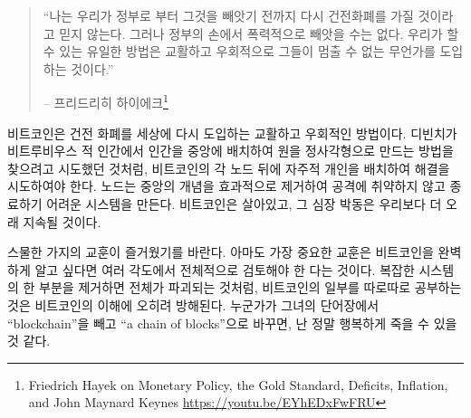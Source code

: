 \begin{quotation}\begin{samepage}
		\enquote{나는 우리가 정부로 부터 그것을 빼앗기 전까지 다시 건전화폐를 가질 것이라고 믿지 않는다. 그러나 정부의 손에서 폭력적으로 빼앗을 수는 없다. 우리가 할 수 있는 유일한 방법은 교활하고 우회적으로 그들이 멈출 수 없는 무언가를 도입하는 것이다.}
		\begin{flushright} -- 프리드리히 하이에크\footnote{Friedrich Hayek on Monetary Policy, the Gold Standard, Deficits, Inflation, and John Maynard Keynes \url{https://youtu.be/EYhEDxFwFRU}}
\end{flushright}\end{samepage}\end{quotation}

\begin{comment}
	Bitcoin is the sly, roundabout way to re-introduce good money to the world. It
	does so by placing a sovereign individual behind each node, just like Da Vinci
	tried to solve the intractable problem of squaring a circle by placing the
	Vitruvian Man in its center. Nodes effectively remove any concept of a center,
	creating a system which is astonishingly antifragile and extremely hard to shut
	down. Bitcoin lives, and its heartbeat will probably outlast all of ours.
\end{comment}
비트코인은 건전 화폐를 세상에 다시 도입하는 교활하고 우회적인 방법이다.
디빈치가 비트루비우스 적 인간에서 인간을 중앙에 배치하여 원을 정사각형으로 만드는 방법을 찾으려고 시도했던 것처럼,
비트코인의 각 노드 뒤에 자주적 개인을 배치하여 해결을 시도하여야 한다.
노드는 중앙의 개념을 효과적으로 제거하여 공격에 취약하지 않고 종료하기 어려운 시스템을 만든다.
비트코인은 살아있고, 그 심장 박동은 우리보다 더 오래 지속될 것이다.

\begin{comment}
	I hope you have enjoyed these twenty-one lessons. Maybe the most important
	lesson is that Bitcoin should be examined holistically, from multiple angles, if
	one would like to have something approximating a complete picture. Just like
	removing one part from a complex system destroys the whole, examining parts of
	Bitcoin in isolation seems to taint the understanding of it. If only one person
	strikes \enquote{blockchain} from her vocabulary and replaces it with \enquote{a
		chain of blocks} I will die a happy man.
\end{comment}
스물한 가지의 교훈이 즐거웠기를 바란다. 
아마도 가장 중요한 교훈은 비트코인을 완벽하게 알고 싶다면 여러 각도에서 전체적으로 검토해야 한 다는 것이다. 
복잡한 시스템의 한 부분을 제거하면 전체가 파괴되는 것처럼, 
비트코인의 일부를 따로따로 공부하는 것은 비트코인의 이해에 오히려 방해된다.
누군가가 그녀의 단어장에서 \enquote{blockchain}을 빼고 \enquote{a chain of blocks}으로 바꾸면,
난 정말 행복하게 죽을 수 있을 것 같다.


